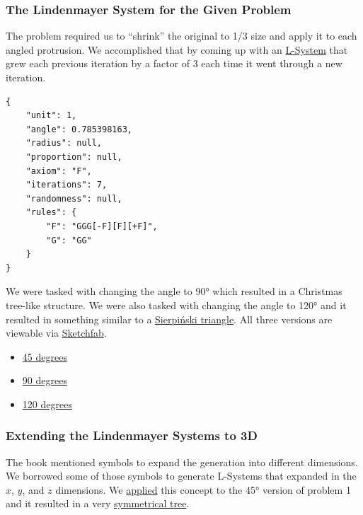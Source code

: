 
\subsubsection{The Lindenmayer System for the Given Problem}
The problem required us to ``shrink'' the original to 1/3 size and apply it to 
each angled protrusion. We accomplished that by coming up with an 
\hyperref[code:prob1_json]{L-System} that grew each previous iteration by a 
factor of 3 each time it went through a new iteration.

\begin{verbatim}
{
    "unit": 1,
    "angle": 0.785398163,
    "radius": null,
    "proportion": null,
    "axiom": "F",
    "iterations": 7,
    "randomness": null,
    "rules": {
        "F": "GGG[-F][F][+F]",
        "G": "GG"
    }
}
\end{verbatim}
\label{code:prob1_json}

We were tasked with changing the angle to 90° which resulted in a 
Christmas tree-like structure. We were also tasked with changing the angle to 
120° and it resulted in something similar to a 
\href{https://en.wikipedia.org/wiki/Sierpi%C5%84ski_triangle}{Sierpiński triangle}. 
All three versions are viewable via 
\href{https://sketchfab.com/macattackftw/collections/problem-1}{Sketchfab}. 

\begin{itemize}
    \item \href{https://sketchfab.com/3d-models/prob1-45-a97f7475b6964b9c930796ba985ac255}{45 degrees}
    \item \href{https://sketchfab.com/3d-models/8c7a25615cee4fb4a51ab3deeae154a0}{90 degrees}
    \item \href{https://sketchfab.com/3d-models/b36c6e912ee548b9a549bd8e0bb273c8}{120 degrees}
\end{itemize}


\subsubsection{Extending the Lindenmayer Systems to 3D}
The book mentioned symbols to expand the generation into different dimensions. 
We borrowed some of those symbols to generate L-Systems that expanded in the 
$x$, $y$, and $z$ dimensions. We \hyperref[code:prob1_3D_json]{applied} this 
concept to the 45° version of problem 1 and it resulted in a very
\href{https://sketchfab.com/3d-models/prob1-3d-236e501897a945d0a3eb5e4cba37fa3a}{symmetrical tree}.

